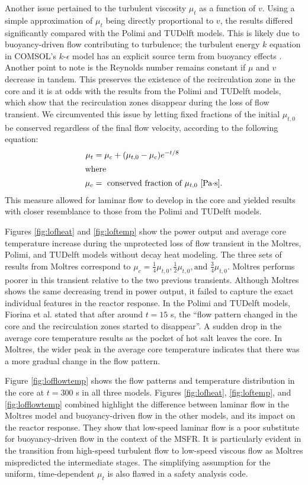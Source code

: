 Another issue pertained to the turbulent viscosity $\mu_t$ as a function of
$v$. Using a simple approximation of $\mu_t$ being directly
proportional to $v$, the results differed significantly compared with the
Polimi and TUDelft models. This is likely due to buoyancy-driven flow
contributing to turbulence; the turbulent energy $k$ equation in COMSOL's
$k$-$\epsilon$ model has an explicit source term from buoyancy effects
\cite{comsol_ab_comsol_2018}. Another point to note is the
Reynolds number remains constant if $\mu$ and $v$ decrease in tandem. This
preserves the existence of the recirculation zone in the core and it is at
odds with the results from the Polimi and TUDelft models, which show that the
recirculation zones disappear during the loss of flow transient. We
circumvented this issue by letting fixed fractions of the initial $\mu_{t,0}$
be conserved regardless of the final flow velocity, according to the following
equation:
%
\begin{align}
    \mu_t &= \mu_c + (\mu_{t,0} - \mu_c) e^{-t/8} \label{lofmu} \\
    \intertext{where}
    \mu_c &= \text{ conserved fraction of $\mu_{t,0}$ [Pa$\cdot$s].} \nonumber
\end{align}
%
This measure allowed for laminar flow to develop in the core and yielded
results with closer resemblance to those from the Polimi and TUDelft models.

Figures \ref{fig:lofheat} and \ref{fig:loftemp} show the power output and
average core temperature increase during the unprotected loss of flow
transient in the Moltres, Polimi, and TUDelft models without decay heat
modeling. The three sets of results from Moltres correspond to $\mu_c =
\frac{1}{4} \mu_{t,0}, \frac{1}{2} \mu_{t,0}, \text{and } \frac{3}{4}
\mu_{t,0}$. Moltres
performs poorer in this transient relative to the two previous transients.
Although Moltres shows the same decreasing trend in power output, it failed to
capture the exact individual features in the reactor response. In the Polimi 
and TUDelft models, Fiorina et al.
stated that after around $t=15$ s, the ``flow pattern changed in the core and
the recirculation zones started to disappear''. A sudden drop in the average
core temperature results as the pocket of hot salt leaves the
core. In Moltres, the wider peak in the average core temperature
indicates that there was a more gradual change in the flow pattern.

Figure \ref{fig:lofflowtemp} shows the flow patterns and temperature
distribution in the core at $t=300$ s in all three models. Figures
\ref{fig:lofheat}, \ref{fig:loftemp}, and \ref{fig:lofflowtemp} combined
highlight the difference between laminar flow in the Moltres model and
buoyancy-driven flow in the other models, and its impact on the reactor
response. They show that low-speed laminar flow is a poor substitute for
buoyancy-driven flow in the context of the MSFR. It is particularly evident
in the transition from high-speed turbulent flow to low-speed viscous
flow as Moltres mispredicted the intermediate stages. The
simplifying assumption for the uniform, time-dependent $\mu_t$ is also flawed
in a safety analysis code.

